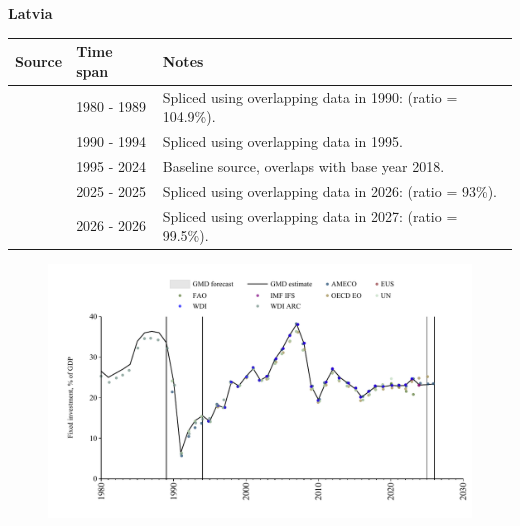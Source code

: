\documentclass[12pt,a4paper,landscape]{article}
\begin{document}
\begin{adjustbox}{max totalsize={\paperwidth}{\paperheight},center}
\begin{minipage}[t][\textheight][t]{\textwidth}
\vspace*{0.5cm}
{}
\begin{center}
{\Large\bfseries Latvia}
\end{center}
\vspace{0.5cm}
\begin{table}[H]
\centering
\small
\begin{tabular}{|l|l|l|}
\hline
\textbf{Source} & \textbf{Time span} & \textbf{Notes} \\
\hline
\rowcolor{white}\cite{WDI_ARC}& 1980 - 1989 &Spliced using overlapping data in 1990: (ratio = 104.9\%).\\
\rowcolor{lightgray}\cite{UN}& 1990 - 1994 &Spliced using overlapping data in 1995.\\
\rowcolor{white}\cite{EUS}& 1995 - 2024 &Baseline source, overlaps with base year 2018.\\
\rowcolor{lightgray}\cite{OECD_EO}& 2025 - 2025 &Spliced using overlapping data in 2026: (ratio = 93\%).\\
\rowcolor{white}\cite{AMECO}& 2026 - 2026 &Spliced using overlapping data in 2027: (ratio = 99.5\%).\\
\hline
\end{tabular}
\end{table}
\begin{figure}[H]
\centering
\includegraphics[width=\textwidth,height=0.6\textheight,keepaspectratio]{graphs/LVA_finv_GDP.pdf}
\end{figure}
\end{minipage}
\end{adjustbox}
\end{document}
